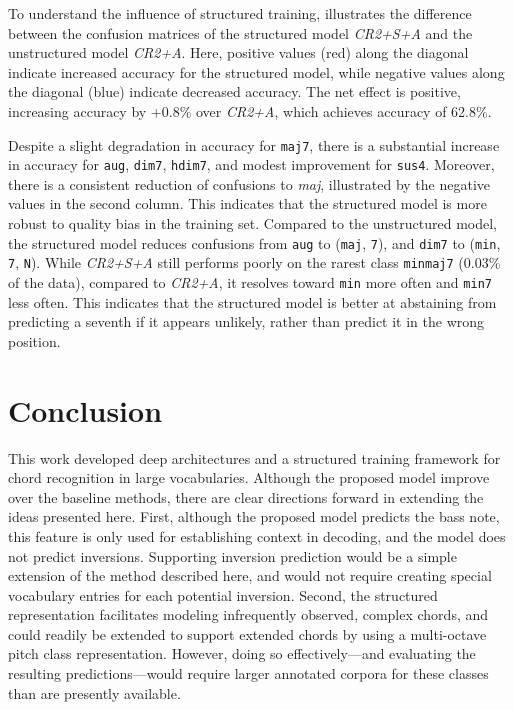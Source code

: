 \documentclass{article}
\begin{document}
To understand the influence of structured training,  illustrates the difference between the confusion matrices of the structured model \emph{CR2+S+A} and the unstructured model \emph{CR2+A}.
Here, positive values (red) along the diagonal indicate increased accuracy for the structured model, while negative values along the diagonal (blue) indicate decreased accuracy.
The net effect is positive, increasing accuracy by +0.8\% over \emph{CR2+A}, which achieves accuracy of 62.8\%.

Despite a slight degradation in accuracy for \texttt{maj7}, there is a substantial increase in accuracy for \texttt{aug}, \texttt{dim7}, \texttt{hdim7}, and modest improvement for \texttt{sus4}.
Moreover, there is a consistent reduction of confusions to \emph{maj}, illustrated by the negative values in the second column.
This indicates that the structured model is more robust to quality bias in the training set.
Compared to the unstructured model, the structured model reduces confusions from \texttt{aug} to (\texttt{maj}, \texttt{7}), and \texttt{dim7} to (\texttt{min}, \texttt{7}, \texttt{N}).
While \emph{CR2+S+A} still performs poorly on the rarest class \texttt{minmaj7} (0.03\% of the data), compared to \emph{CR2+A}, it resolves toward \texttt{min} more often and \texttt{min7} less often.
This indicates that the structured model is better at abstaining from predicting a seventh if it appears unlikely, rather than predict it in the wrong position.


\section{Conclusion}
This work developed deep architectures and a structured training framework for chord recognition in large vocabularies.
Although the proposed model improve over the baseline methods, there are clear directions forward in extending the ideas presented here.
First, although the proposed model predicts the bass note, this feature is only used for establishing context in decoding, and the model does not predict inversions.
Supporting inversion prediction would be a simple extension of the method described here, and would not require creating special vocabulary entries for each potential inversion.
Second, the structured representation facilitates modeling infrequently observed, complex chords, and could readily be extended to support extended chords by using a multi-octave pitch class representation.
However, doing so effectively---and evaluating the resulting predictions---would require larger annotated corpora for these classes than are presently available.

%       




\end{document}
